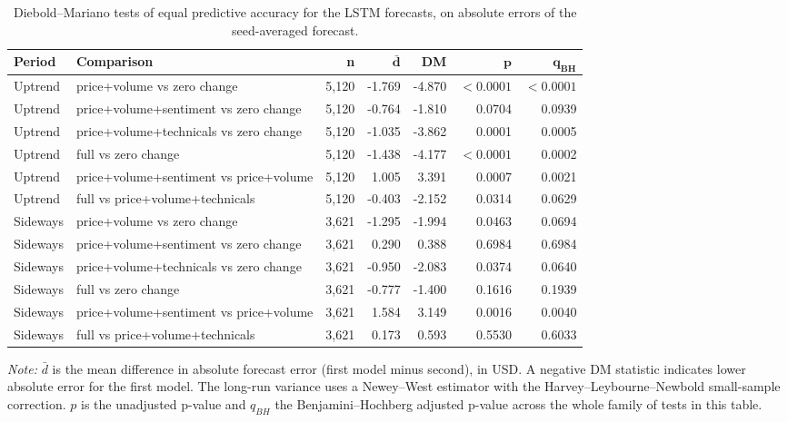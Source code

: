 \begin{table}[H]
\footnotesize
\centering
\begin{threeparttable}
\caption{Diebold--Mariano tests of equal predictive accuracy for the LSTM forecasts, on absolute errors of the seed-averaged forecast.}
\label{tab:lstm_dm_tests}
\renewcommand{\arraystretch}{1.1}
\setlength{\tabcolsep}{6pt}
\begin{tabular}{llrrrrr}
\toprule
\textbf{Period} & \textbf{Comparison} & \textbf{n} & $\bm{\bar{d}}$ & \textbf{DM} & $\bm{p}$ & $\bm{q_{BH}}$ \\
\midrule
Uptrend & price+volume vs zero change & 5,120 & -1.769 & -4.870 & $<0.0001$ & $<0.0001$ \\
Uptrend & price+volume+sentiment vs zero change & 5,120 & -0.764 & -1.810 & 0.0704 & 0.0939 \\
Uptrend & price+volume+technicals vs zero change & 5,120 & -1.035 & -3.862 & 0.0001 & 0.0005 \\
Uptrend & full vs zero change & 5,120 & -1.438 & -4.177 & $<0.0001$ & 0.0002 \\
Uptrend & price+volume+sentiment vs price+volume & 5,120 & 1.005 & 3.391 & 0.0007 & 0.0021 \\
Uptrend & full vs price+volume+technicals & 5,120 & -0.403 & -2.152 & 0.0314 & 0.0629 \\
\midrule
Sideways & price+volume vs zero change & 3,621 & -1.295 & -1.994 & 0.0463 & 0.0694 \\
Sideways & price+volume+sentiment vs zero change & 3,621 & 0.290 & 0.388 & 0.6984 & 0.6984 \\
Sideways & price+volume+technicals vs zero change & 3,621 & -0.950 & -2.083 & 0.0374 & 0.0640 \\
Sideways & full vs zero change & 3,621 & -0.777 & -1.400 & 0.1616 & 0.1939 \\
Sideways & price+volume+sentiment vs price+volume & 3,621 & 1.584 & 3.149 & 0.0016 & 0.0040 \\
Sideways & full vs price+volume+technicals & 3,621 & 0.173 & 0.593 & 0.5530 & 0.6033 \\
\bottomrule
\end{tabular}
\begin{tablenotes}[flushleft]
\footnotesize
\item \textit{Note:} $\bar{d}$ is the mean difference in absolute forecast error (first model minus second), in USD. A negative DM statistic indicates lower absolute error for the first model. The long-run variance uses a Newey--West estimator with the Harvey--Leybourne--Newbold small-sample correction. $p$ is the unadjusted p-value and $q_{BH}$ the Benjamini--Hochberg adjusted p-value across the whole family of tests in this table.
\end{tablenotes}
\end{threeparttable}
\end{table}
